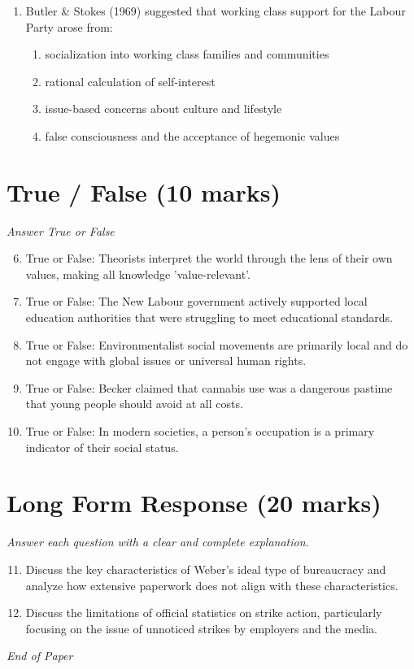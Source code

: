 \documentclass[12pt]{article}
\begin{document}
\begin{enumerate}[label=\arabic*.]
\begin{enumerate}[label=(\alph*)]
    \item they are in pursuit of the 'perfect' body, fuelled by images of beauty
    \item they perceive a part of their body as stigmatizing, in relation to a cultural ideal
    \item their male partners pressurize them to look like supermodels
\end{enumerate}
\item Butler \& Stokes (1969) suggested that working class support for the Labour Party arose from:
\begin{enumerate}[label=(\alph*)]
    \item socialization into working class families and communities
    \item rational calculation of self-interest
    \item issue-based concerns about culture and lifestyle
    \item false consciousness and the acceptance of hegemonic values
\end{enumerate}
\end{enumerate}

\section*{True / False (10 marks)}
\textit{Answer True or False}
\begin{enumerate}[label=\arabic*.]
\setcounter{enumi}{5}
\item True or False: Theorists interpret the world through the lens of their own values, making all knowledge 'value-relevant'.
\item True or False: The New Labour government actively supported local education authorities that were struggling to meet educational standards.
\item True or False: Environmentalist social movements are primarily local and do not engage with global issues or universal human rights.
\item True or False: Becker claimed that cannabis use was a dangerous pastime that young people should avoid at all costs.
\item True or False: In modern societies, a person's occupation is a primary indicator of their social status.
\end{enumerate}

\section*{Long Form Response (20 marks)}
\textit{Answer each question with a clear and complete explanation.}
\begin{enumerate}[label=\arabic*.]
\setcounter{enumi}{10}
\item Discuss the key characteristics of Weber's ideal type of bureaucracy and analyze how extensive paperwork does not align with these characteristics.
\item Discuss the limitations of official statistics on strike action, particularly focusing on the issue of unnoticed strikes by employers and the media.
\end{enumerate}

\vfill
\noindent\textit{End of Paper}
\end{document}
